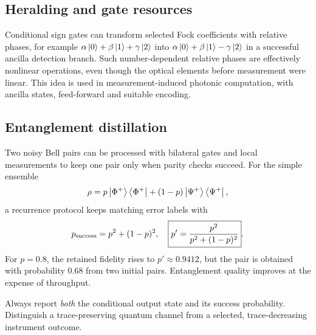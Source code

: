 \subsection{Heralding and gate resources}
Conditional sign gates can transform selected
Fock coefficients with relative phases,
for example \(\alpha\left\lvert 0\right\rangle+\beta\left\lvert 1\right\rangle+
\gamma\left\lvert 2\right\rangle\) into
\(\alpha\left\lvert 0\right\rangle+\beta\left\lvert 1\right\rangle-\gamma\left\lvert 2\right\rangle\)
in a successful ancilla detection branch.
Such number-dependent relative phases
are effectively nonlinear operations,
even though the optical elements
before measurement were linear.
This idea is used in measurement-induced
photonic computation, with ancilla states,
feed-forward and suitable encoding.

\subsection{Entanglement distillation}
Two noisy Bell pairs can be processed
with bilateral gates and local measurements
to keep one pair only when parity checks
succeed. For the simple ensemble
\[
\rho=p\left\lvert \Phi^+\right\rangle\left\langle \Phi^+\right\rvert
+(1-p)\left\lvert \Psi^+\right\rangle\left\langle \Psi^+\right\rvert,
\]
a recurrence protocol keeps matching
error labels with
\[
p_{\rm success}=p^2+(1-p)^2,
\quad
\boxed{p'=\frac{p^2}{p^2+(1-p)^2}}.
\]
For \(p=0.8\), the retained fidelity
rises to \(p'\approx0.9412\),
but the pair is obtained with probability
\(0.68\) from two initial pairs.
Entanglement quality improves at the
expense of throughput.

\begin{checkpoint}
Always report \emph{both} the conditional
output state and its success probability.
Distinguish a trace-preserving quantum
channel from a selected, trace-decreasing
instrument outcome.
\end{checkpoint}
